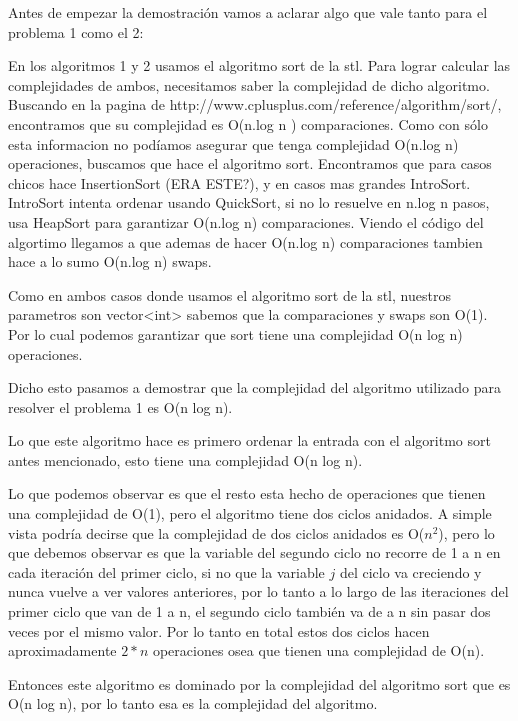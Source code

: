 Antes de empezar la demostración vamos a aclarar algo que vale tanto para el problema 1 como el 2:

En los algoritmos 1 y 2 usamos el algoritmo sort de la stl. Para lograr calcular las complejidades de ambos, necesitamos saber la complejidad de dicho algoritmo. Buscando en la pagina de http://www.cplusplus.com/reference/algorithm/sort/, encontramos que su complejidad es O(n.log n ) comparaciones. Como con sólo esta informacion no podíamos asegurar que tenga complejidad O(n.log n) operaciones, buscamos que hace el algoritmo sort. Encontramos que para casos chicos hace InsertionSort (ERA ESTE?), y en casos mas grandes IntroSort. IntroSort intenta ordenar usando QuickSort, si no lo resuelve en n.log n pasos, usa HeapSort para garantizar O(n.log n) comparaciones. Viendo el código del algortimo llegamos a que ademas de hacer O(n.log n) comparaciones tambien hace a lo sumo O(n.log n) swaps.

Como en ambos casos donde usamos el algoritmo sort de la stl, nuestros parametros son vector<int> sabemos que la comparaciones y swaps son O(1). Por lo cual podemos garantizar que sort tiene una complejidad O(n log n) operaciones.

Dicho esto pasamos a demostrar que la complejidad del algoritmo utilizado para resolver el problema 1 es O(n log n).


Lo que este algoritmo hace es primero ordenar la entrada con el algoritmo sort antes mencionado, esto tiene una complejidad O(n log n). 

Lo que podemos observar es que el resto esta hecho de operaciones que tienen una complejidad de O(1), pero el algoritmo tiene dos ciclos anidados. A simple vista podría decirse que la complejidad de dos ciclos anidados es O($n{^2}$), pero lo que debemos observar es que la variable del segundo ciclo no recorre de 1 a n en cada iteración del primer ciclo, si no que la variable $j$ del ciclo va creciendo y nunca vuelve a ver valores anteriores, por lo tanto a lo largo de las iteraciones del primer ciclo que van de 1 a n, el segundo ciclo también va de  a n sin pasar dos veces por el mismo valor. Por lo tanto en total estos dos ciclos hacen aproximadamente $2*n$ operaciones osea que tienen una complejidad de O(n).

Entonces este algoritmo es dominado por la complejidad del algoritmo sort que es O(n log n), por lo tanto esa es la complejidad del algoritmo. 